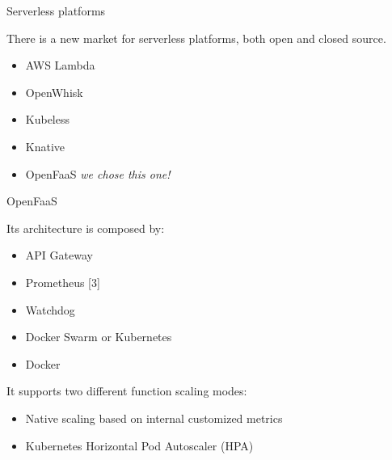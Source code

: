 \begin{frame}{Serverless platforms}

There is a new market for serverless platforms, both open and closed source.

\begin{itemize}
    \item AWS Lambda
    \item OpenWhisk
    \item Kubeless
    \item Knative
    \item OpenFaaS \alert{\textit{we chose this one!}}
\end{itemize}
    
\end{frame}

\begin{frame}{OpenFaaS}

Its architecture is composed by:

\begin{itemize}
    \item API Gateway
    \item Prometheus [3]
    \item Watchdog
    \item Docker Swarm or Kubernetes
    \item Docker
\end{itemize}

It supports two different function scaling modes:

\begin{itemize}
    \item Native scaling based on internal customized metrics
    \item Kubernetes Horizontal Pod Autoscaler (HPA)
\end{itemize}

\end{frame}